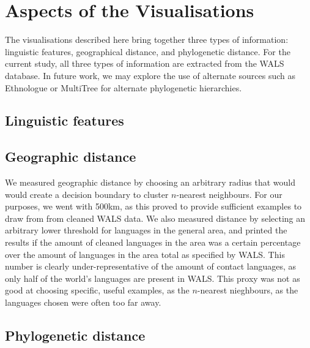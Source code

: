 \documentclass[11pt]{article}
\begin{document}
\section{Aspects of the Visualisations}

The visualisations described here bring together three types of information: linguistic features, geographical distance, and phylogenetic distance. For the current study, all three types of information are extracted from the WALS database. In future work, we may explore the use of alternate sources such as Ethnologue \cite{ethnologue} or MultiTree \cite{multitree} for alternate phylogenetic hierarchies. 

\subsection{Linguistic features}
\subsection{Geographic distance}
We measured geographic distance by choosing an arbitrary radius that would would create a decision boundary to cluster $n$-nearest neighbours. For our purposes, we went with 500km, as this proved to provide sufficient examples to draw from from cleaned WALS data. We also measured distance by selecting an arbitrary lower threshold for languages in the general area, and printed the results if the amount of cleaned languages in the area was a certain percentage over the amount of languages in the area total as specified by WALS. This number is clearly under-representative of the amount of contact languages, as only half of the world's languages are present in WALS. This proxy was not as good at choosing specific, useful examples, as the $n$-nearest nieghbours, as the languages chosen were often too far away. 

\subsection{Phylogenetic distance}
\end{document}
